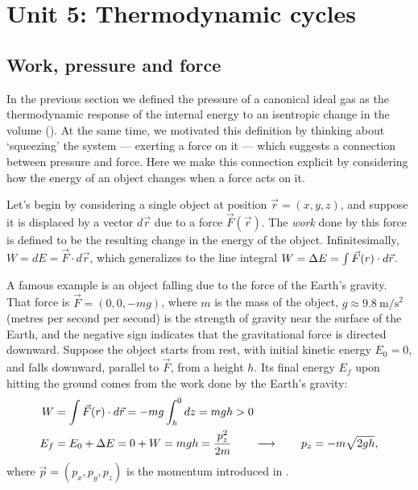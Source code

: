 \renewcommand{\thisunit}{MATH327 Unit 5}
\renewcommand{\moddate}{Last modified 7 Mar.~2024}
\setcounter{section}{5}
\setcounter{subsection}{0}
{}
\section*{Unit 5: Thermodynamic cycles}
\subsection{\label{sec:work}Work, pressure and force}
In the previous section we defined the pressure of a canonical ideal gas as the thermodynamic response of the internal energy to an isentropic change in the volume ().
At the same time, we motivated this definition by thinking about `squeezing' the system --- exerting a force on it --- which suggests a connection between pressure and force.
Here we make this connection explicit by considering how the energy of an object changes when a force acts on it.

Let's begin by considering a single object at position $\vec r = (x, y, z)$, and suppose it is displaced by a vector $d\vec r$ due to a force $\vec F(\vec r)$.
The \emph{work} done by this force is defined to be the resulting change in the energy of the object.
Infinitesimally, $W = dE = \vec F\cdot d\vec r$, which generalizes to the line integral $W = \Delta E = \int \vec F(r)\cdot d\vec r$.

A famous example is an object falling due to the force of the Earth's gravity.
That force is $\vec F = (0, 0, -mg)$, where $m$ is the mass of the object, $g \approx 9.8~\mathrm{m}/\mathrm{s}^2$ (metres per second per second) is the strength of gravity near the surface of the Earth, and the negative sign indicates that the gravitational force is directed downward.
Suppose the object starts from rest, with initial kinetic energy $E_0 = 0$, and falls downward, parallel to $\vec F$, from a height $h$.
Its final energy $E_f$ upon hitting the ground comes from the work done by the Earth's gravity:
\begin{align*}
  W & = \int \vec F(r)\cdot d\vec r = -mg \int_h^0 dz = mgh > 0 \\
  E_f & = E_0 + \Delta E = 0 + W = mgh = \frac{p_z^2}{2m} \qquad \longrightarrow \qquad p_z = -m\sqrt{2gh},
\end{align*}
where $\vec p = (p_x, p_y, p_z)$ is the momentum introduced in .

